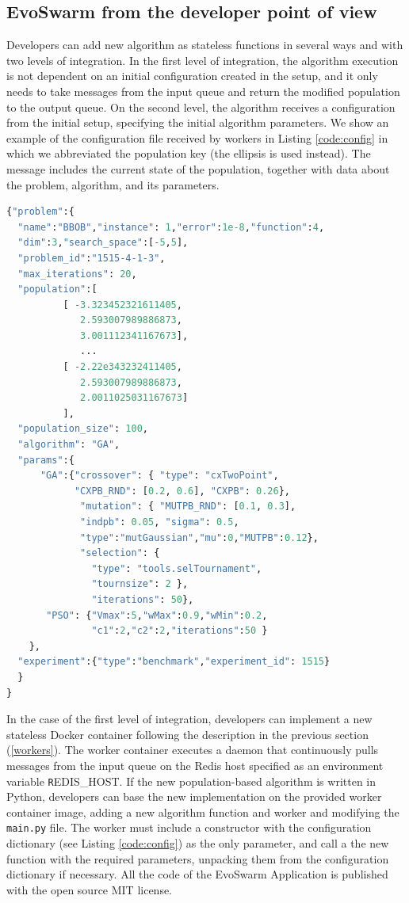 \documentclass[review]{elsarticle}
\begin{document}
\subsection{EvoSwarm from the developer point of view} 

Developers can add new algorithm as stateless functions in
several ways and with two levels of integration. In the first level of
integration, the algorithm execution is not dependent on an initial
configuration created in the setup, and it only needs to take messages from the
input queue and return the modified population to the output queue. On the
second level, the algorithm receives a configuration from the initial setup,
specifying the initial algorithm parameters. We show an example of the configuration
file received by workers in Listing \ref{code:config}  in which we abbreviated
the population key (the ellipsis is used instead). The message includes the current state
of the population, together with data about the problem, algorithm,
and its parameters. 

\begin{lstlisting}[language=Python, caption = Configuration message example, label=code:config]
{"problem":{
  "name":"BBOB","instance": 1,"error":1e-8,"function":4,
  "dim":3,"search_space":[-5,5],
  "problem_id":"1515-4-1-3",
  "max_iterations": 20,
  "population":[
          [ -3.323452321611405, 
             2.593007989886873, 
             3.001112341167673],
             ...
          [ -2.22e343232411405, 
             2.593007989886873, 
             2.0011025031167673] 
          ],
  "population_size": 100,
  "algorithm": "GA",  
  "params":{
      "GA":{"crossover": { "type": "cxTwoPoint", 
            "CXPB_RND": [0.2, 0.6], "CXPB": 0.26},
             "mutation": { "MUTPB_RND": [0.1, 0.3], 
             "indpb": 0.05, "sigma": 0.5, 
             "type":"mutGaussian","mu":0,"MUTPB":0.12},
             "selection": { 
               "type": "tools.selTournament", 
               "tournsize": 2 },
               "iterations": 50},
       "PSO": {"Vmax":5,"wMax":0.9,"wMin":0.2,
               "c1":2,"c2":2,"iterations":50 } 
    },
  "experiment":{"type":"benchmark","experiment_id": 1515}
  }
}
\end{lstlisting}

In the case of the first level of integration, developers
can implement a new stateless Docker container following
the description in the previous section (\ref{workers}). The worker
container executes a daemon that continuously pulls messages from the input queue
on the Redis host specified as an environment variable {\texttt REDIS\_HOST}. If the new
population-based algorithm is written in Python, developers can base the new
implementation on the provided worker container image, adding a new algorithm
function and worker and modifying the \texttt{main.py} file. 
The worker must include a constructor with the configuration dictionary 
(see Listing \ref{code:config}) as the only parameter, and call a the new function 
with the required parameters, unpacking them from the configuration dictionary if necessary.
All the code of the EvoSwarm Application is published with the open source MIT license.
\end{document}
